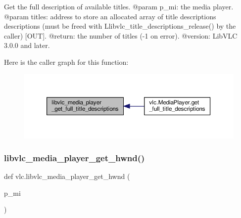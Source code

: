 \begin{DoxyVerb}Get the full description of available titles.
@param p_mi: the media player.
@param titles: address to store an allocated array of title descriptions descriptions (must be freed with L{libvlc_title_descriptions_release}() by the caller) [OUT].
@return: the number of titles (-1 on error).
@version: LibVLC 3.0.0 and later.
\end{DoxyVerb}
 Here is the caller graph for this function\+:
\nopagebreak
\begin{figure}[H]
\begin{center}
\leavevmode
\includegraphics[width=350pt]{namespacevlc_a61a2bcf2cf564f255a1087a54d5df1b6_icgraph}
\end{center}
\end{figure}
\mbox{\label{namespacevlc_a30619d7bd21f38cf0e01306c37635269}} 
\subsubsection{\texorpdfstring{libvlc\+\_\+media\+\_\+player\+\_\+get\+\_\+hwnd()}{libvlc\_media\_player\_get\_hwnd()}}
{\footnotesize\ttfamily def vlc.\+libvlc\+\_\+media\+\_\+player\+\_\+get\+\_\+hwnd (\begin{DoxyParamCaption}\item[{}]{p\+\_\+mi }\end{DoxyParamCaption})}

